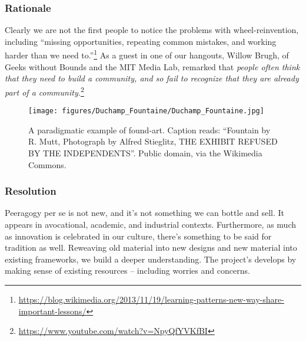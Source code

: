 
\subsubsection*{Rationale} 
Clearly we are not the first people to notice the problems with wheel-reinvention, including ``missing opportunities, repeating common mistakes, and working harder than we need to.''\footnote{\url{https://blog.wikimedia.org/2013/11/19/learning-patterns-new-way-share-important-lessons/}}  As a guest in one of our hangouts, Willow Brugh, of Geeks without Bounds and the MIT Media Lab, remarked that \emph{people often think that they need to build a community, and so fail to recognize that they are already part of a community.}\footnote{\url{https://www.youtube.com/watch?v=NpyQfYVKfBI}}

\begin{wrapfigure}{l}{.42\textwidth}
\vspace{-.5cm}
\begin{center}
\texttt{[image: figures/Duchamp\_Fountaine/Duchamp\_Fountaine.jpg]}
\end{center}
\caption{A paradigmatic example of found-art. Caption reads: ``Fountain by R. Mutt, Photograph by Alfred Stieglitz, THE EXHIBIT REFUSED BY THE INDEPENDENTS''. Public domain, via the Wikimedia Commons.\label{fountain}}
\vspace{-.9cm}
\end{wrapfigure}

\subsubsection*{Resolution}  Peeragogy per se is not new, and it's not something we can bottle and sell. It appears in avocational, academic, and industrial contexts.  Furthermore, as much as innovation is celebrated in our culture, there's something to be said for tradition as well.  Reweaving old material into new designs and new material into existing frameworks, we build a deeper understanding.
%
The project's  develops by making sense of existing resources -- including worries and concerns.

